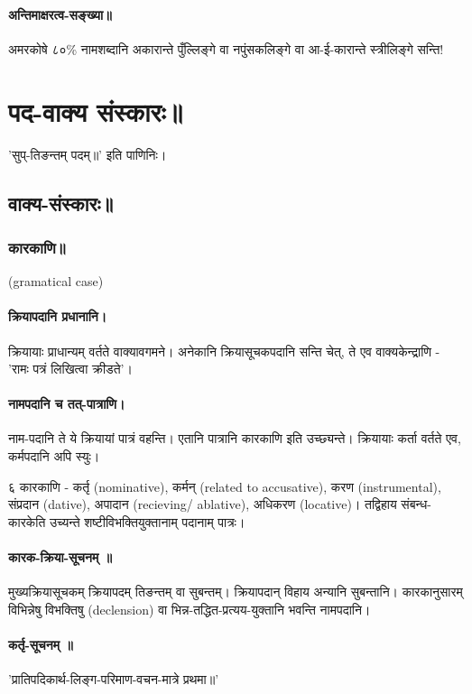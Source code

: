 \documentclass[oneside, article]{memoir}
\begin{document}
\subsection{अन्तिमाक्षरत्व-सङ्ख्या॥}
अमरकोषे ८०\% नामशब्दानि अकारान्ते पुँल्लिङ्गे वा नपुंसकलिङ्गे वा आ-ई-कारान्ते स्त्रीलिङ्गे सन्ति!



\part{पद-वाक्य संस्कारः॥}
'सुप्-तिङन्तम् पदम्॥' इति पाणिनिः।

\chapter{वाक्य-संस्कारः॥}
\section{कारकाणि॥}
(gramatical case)

\subsection{क्रियापदानि प्रधानानि।}
क्रियायाः प्राधान्यम् वर्तते वाक्यावगमने। अनेकानि क्रियासूचकपदानि सन्ति चेत्, ते एव वाक्यकेन्द्राणि - 'रामः पत्रं लिखित्वा क्रीडते'।

\subsection{नामपदानि च तत्-पात्राणि।}
नाम-पदानि ते ये क्रियायां पात्रं वहन्ति। एतानि पात्रानि कारकाणि इति उच्छ्यन्ते। क्रियायाः कर्ता वर्तते एव, कर्मपदानि अपि स्युः।

६ कारकाणि - कर्तृ (nominative), कर्मन् (related to accusative), करण (instrumental), संप्रदान (dative), अपादान (recieving/ ablative), अधिकरण (locative)। तद्विहाय संबन्ध-कारकेति उच्यन्ते शष्टीविभक्तियुक्तानाम् पदानाम् पात्रः।

\subsection{कारक-क्रिया-सूचनम् ॥}
मुख्यक्रियासूचकम् क्रियापदम् तिङन्तम् वा सुबन्तम्। क्रियापदान् विहाय अन्यानि सुबन्तानि।  कारकानुसारम् विभिन्नेषु विभक्तिषु (declension) वा भिन्न-तद्धित-प्रत्यय-युक्तानि भवन्ति नामपदानि।

\subsection{कर्तृ-सूचनम् ॥}
'प्रातिपदिकार्थ-लिङ्ग-परिमाण-वचन-मात्रे प्रथमा॥'
\end{document}
